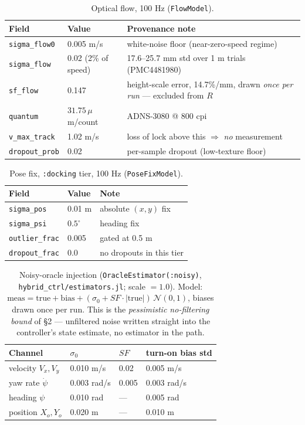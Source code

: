 \documentclass[11pt]{article}
\begin{document}
\begin{table}[h]\centering\footnotesize
\caption{Optical flow, 100 Hz (\texttt{FlowModel}).}
\label{tab:flow}
\begin{tabular}{llp{6.2cm}}
\toprule
Field & Value & Provenance note\\
\midrule
\texttt{sigma\_flow0} & 0.005 m/s & white-noise floor (near-zero-speed regime)\\
\texttt{sigma\_flow} & 0.02 (2\% of speed) & 17.6--25.7 mm std over 1 m trials (PMC4481980)\\
\texttt{sf\_flow} & 0.147 & height-scale error, 14.7\%/mm, drawn \emph{once per run} --- excluded from $R$\\
\texttt{quantum} & $31.75\,\mu$m/count & ADNS-3080 @ 800 cpi\\
\texttt{v\_max\_track} & 1.02 m/s & loss of lock above this $\Rightarrow$ \emph{no} measurement\\
\texttt{dropout\_prob} & 0.02 & per-sample dropout (low-texture floor)\\
\bottomrule
\end{tabular}
\end{table}

\begin{table}[h]\centering\footnotesize
\caption{Pose fix, \texttt{:docking} tier, 100 Hz (\texttt{PoseFixModel}).}
\label{tab:posefix}
\begin{tabular}{llp{4.5cm}}
\toprule
Field & Value & Note\\
\midrule
\texttt{sigma\_pos} & 0.01 m & absolute $(x,y)$ fix\\
\texttt{sigma\_psi} & $0.5^\circ$ & heading fix\\
\texttt{outlier\_frac} & 0.005 & gated at 0.5 m\\
\texttt{dropout\_frac} & 0.0 & no dropouts in this tier\\
\bottomrule
\end{tabular}
\end{table}

\begin{table}[h]\centering\footnotesize
\caption{Noisy-oracle injection (\texttt{OracleEstimator(:noisy)},
\texttt{hybrid\_ctrl/estimators.jl}; scale $=1.0$). Model:
$\mathrm{meas} = \mathrm{true} + \mathrm{bias} + (\sigma_0 + SF\cdot|\mathrm{true}|)\,\mathcal N(0,1)$,
biases drawn once per run. This is the \emph{pessimistic no-filtering bound} of \S2 ---
unfiltered noise written straight into the controller's state estimate, no estimator in
the path.}
\label{tab:oracle}
\begin{tabular}{llll}
\toprule
Channel & $\sigma_0$ & $SF$ & turn-on bias std\\
\midrule
velocity $V_x,V_y$ & 0.010 m/s & 0.02 & 0.005 m/s\\
yaw rate $\dot\psi$ & 0.003 rad/s & 0.005 & 0.003 rad/s\\
heading $\psi$ & 0.010 rad & --- & 0.005 rad\\
position $X_o,Y_o$ & 0.020 m & --- & 0.010 m\\
\bottomrule
\end{tabular}
\end{table}
\end{document}
